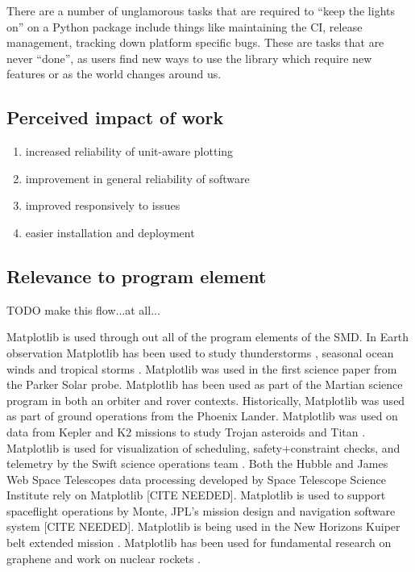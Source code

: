 \documentclass[12pt]{article}
\numberwithin{page}{section}
\begin{document}
There are a number of unglamorous tasks that are required to ``keep
the lights on'' on a Python package include things like maintaining
the CI, release management, tracking down platform specific bugs.
These are tasks that are never ``done'', as users find new ways to use
the library which require new features or as the world changes around
us.

\subsection{Perceived impact of work}
\begin{enumerate}
\item increased reliability of unit-aware plotting
\item improvement in general reliability of software
\item improved responsively to issues
\item easier installation and deployment
\end{enumerate}
\subsection{Relevance to program element}

TODO make this flow...at all...

Matplotlib is used through out all of the program elements of the SMD.
In Earth observation Matplotlib has been used to study thunderstorms
\cite{https://doi.org/10.1002/2016JD025299,https://doi.org/10.1029/2019JD030874},
seasonal ocean winds \cite{https://doi.org/10.1002/2017JD027516} and
tropical storms \cite{Lang_2020}.  Matplotlib was used in the first
science paper from the Parker Solar probe\cite{Bale2019}.  Matplotlib
has been used as part of the Martian science program in both an
orbiter \cite{https://doi.org/10.1029/2019JE006188} and
rover\cite{https://doi.org/10.1002/2016EA000219} contexts.
Historically, Matplotlib was used as part of ground operations from
the Phoenix Lander.  Matplotlib was used on data from Kepler and K2
missions to study Trojan asteroids\cite{Nixon_2019} and Titan
\cite{Ryan_2017,2019PASP..131h4505P}.
Matplotlib is used for visualization of scheduling, safety+constraint checks, and telemetry by the Swift science operations team \cite{swift_ops,2020ApJ...900...35T}.
Both the Hubble and James Web Space Telescopes data processing
developed by Space Telescope Science Institute rely on Matplotlib [CITE NEEDED].
Matplotlib is used to support spaceflight operations by Monte, JPL's
mission design and navigation software system [CITE NEEDED].
Matplotlib is being used in the New Horizons Kuiper belt extended mission \cite{Porter_2018}.  Matplotlib
has been used for fundamental research on graphene \cite{PhysRevLett.120.236802} and
work on nuclear rockets \cite{leu_cerment}.
\end{document}

